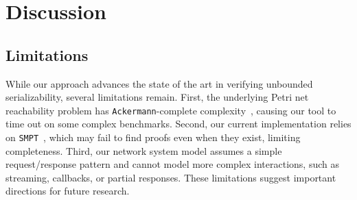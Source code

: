 

\section{Discussion}
\label{sec:discussion}



%




\subsection{Limitations}
While our approach advances the state of the art in verifying unbounded serializability, several limitations remain.
First, the underlying Petri net reachability problem has \texttt{Ackermann}-complete complexity~\cite{CzWo22,Le22}, causing our tool to time out on some complex benchmarks. %
Second, our current implementation relies on \texttt{SMPT}~\cite{AmDa23}, which may fail to find proofs even when they exist, limiting completeness.
Third, our network system model assumes a simple request/response pattern and cannot model more complex interactions, such as streaming, callbacks, or partial responses.
These limitations suggest important directions for future research.

